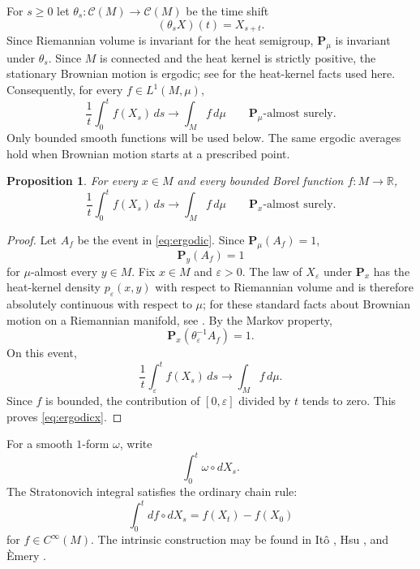\documentclass[a4paper,reqno]{amsart}
\newcommand{\R}{\mathbb R}
\newcommand{\Ccal}{\mathcal C}
\newcommand{\Pp}{\mathbf P}
\newtheorem{proposition}[theorem]{Proposition}
\theoremstyle{definition}
\begin{document}
For $s\ge0$ let $\theta_s:\Ccal(M)\to\Ccal(M)$ be the time shift
\[
   (\theta_sX)(t)=X_{s+t}.
\]
Since Riemannian volume is invariant for the heat semigroup, $\Pp_\mu$ is invariant under $\theta_s$.  Since $M$ is connected and the heat kernel is strictly positive, the stationary Brownian motion is ergodic; see \cite{Hsu} for the heat-kernel facts used here.  Consequently, for every $f\in L^1(M,\mu)$,
\begin{equation}\label{eq:ergodic}
   \frac1t\int_0^t f(X_s)\,ds
   \longrightarrow \int_M f\,d\mu
   \qquad \Pp_\mu\text{-almost surely}.
\end{equation}
Only bounded smooth functions will be used below.  The same ergodic averages hold when Brownian motion starts at a prescribed point.

\begin{proposition}\label{prop:ergodic-start}
For every $x\in M$ and every bounded Borel function $f:M\to\R$,
\begin{equation}\label{eq:ergodicx}
   \frac1t\int_0^t f(X_s)\,ds
   \longrightarrow \int_M f\,d\mu
   \qquad \Pp_x\text{-almost surely}.
\end{equation}
\end{proposition}

\begin{proof}
Let $A_f$ be the event in \eqref{eq:ergodic}.  Since $\Pp_\mu(A_f)=1$,
\[
   \Pp_y(A_f)=1
\]
for $\mu$-almost every $y\in M$.  Fix $x\in M$ and $\varepsilon>0$.  The law of $X_\varepsilon$ under $\Pp_x$ has the heat-kernel density $p_\varepsilon(x,y)$ with respect to Riemannian volume and is therefore absolutely continuous with respect to $\mu$; for these standard facts about Brownian motion on a Riemannian manifold, see \cite{Hsu}.  By the Markov property,
\[
   \Pp_x(\theta_\varepsilon^{-1}A_f)=1.
\]
On this event,
\[
 \frac1t\int_\varepsilon^t f(X_s)\,ds
 \longrightarrow \int_M f\,d\mu.
\]
Since $f$ is bounded, the contribution of $[0,\varepsilon]$ divided by $t$ tends to zero.  This proves \eqref{eq:ergodicx}.
\end{proof}

For a smooth $1$-form $\omega$, write
\[
   \int_0^t\omega\circ dX_s.
\]
The Stratonovich integral satisfies the ordinary chain rule:
\begin{equation}\label{eq:chainrule}
   \int_0^t df\circ dX_s=f(X_t)-f(X_0)
\end{equation}
for $f\in C^\infty(M)$.  The intrinsic construction may be found in It\^o \cite{Ito1963}, Hsu \cite{Hsu}, and \`Emery \cite{Emery}.
\end{document}

